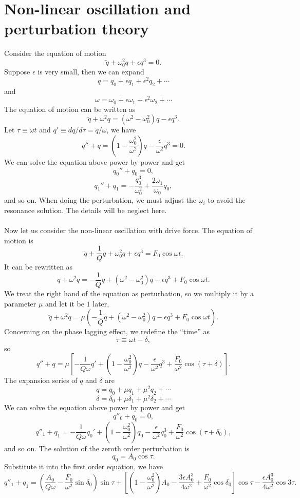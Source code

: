 \section{Non-linear oscillation and perturbation theory}
Consider the equation of motion
\[\ddot{q} + \omega_0^2 q + \epsilon q^3 = 0.\]
Suppose $\epsilon$ is very small, then we can expand
\[q = q_0 + \epsilon q_1 + \epsilon^2 q_2 + \cdots \]
and
\[\omega = \omega_0 + \epsilon \omega_1 + \epsilon^2 \omega_2 + \cdots \]
The equation of motion can be written as
\[\ddot{q} + \omega^2 q = (\omega^2 -\omega_0^2)q - \epsilon q^3.\]
Let $\tau \equiv \omega t$ and $q' \equiv {dq}/{d\tau} = {\dot{q}}/{\omega}$, we have
\[q'' + q = (1- \frac{\omega_0^2}{\omega^2})q - \frac{\epsilon}{\omega^2} q^3 = 0.\]
We can solve the equation above power by power and get
\[q_0'' + q_0 = 0 ,\]
\[q_1'' + q_1 = -\frac{q_0^3}{\omega_0^2} + \frac{2\omega_1}{\omega_0}q_0, \]
and so on. 
When doing the perturbation, we must adjust the $\omega_i$ to avoid the resonance solution. The details will be neglect here.
\\ \\
Now let us consider the non-linear oscillation with drive force. The equation of motion is
\[\ddot{q} + \frac{1}{Q}\dot{q} + \omega_0^2 q + \epsilon q^3 = F_0 \cos \omega t.\]
It can be rewritten as
\[\ddot{q} + \omega^2 q = - \frac{1}{Q} \dot{q} + (\omega^2 - \omega_0^2)q - \epsilon q^3 + F_0\cos\omega t.\]
We treat the right hand of the equation as perturbation, so we multiply it by a parameter $\mu$ and let it be $1$ later,
\[\ddot{q} + \omega^2 q = \mu \left (- \frac{1}{Q} \dot{q} + (\omega^2 - \omega_0^2)q - \epsilon q^3 + F_0\cos\omega t \right ).\]
Concerning on the phase lagging effect, we redefine the ``time'' as 
\[\tau \equiv \omega t - \delta, \]
so 
\[q'' + q = \mu \left [ -\frac{1}{Q\omega} q' + \left ( 1- \frac{\omega_0^2}{\omega^2} \right ) q - \frac{\epsilon}{\omega^2} q^3 + \frac{F_0}{\omega^2} \cos (\tau + \delta) \right ].\]
The expansion series of $q$ and $\delta$ are
\[q = q_0 + \mu q_1 + \mu^2 q_2 + \cdots \]
\[\delta = \delta_0 + \mu \delta_1 + \mu^2 \delta_2 + \cdots \]
We can solve the equation above power by power and get
\[q''_0 + q_0 = 0,\]
\[q''_1 + q_1 =  -\frac{1}{Q\omega} q_0' + \left ( 1- \frac{\omega_0^2}{\omega^2} \right ) q_0 - \frac{\epsilon}{\omega^2} q_0^3 + \frac{F_0}{\omega^2} \cos (\tau + \delta_0), \]
and so on. 
The solution of the zeroth order perturbation is
\[q_0 = A_0 \cos\tau.\]
Substitute it into the first order equation, we have
\[q''_1 + q_1 = \left ( \frac{A_0}{Q\omega} - \frac{F_0}{\omega^2} \sin\delta_0 \right ) \sin\tau + \left [ \left ( 1 - \frac{\omega_0^2}{\omega^2}\right ) A_0 - \frac{3\epsilon A_0^3}{4\omega^2} + \frac{F_0}{\omega^2}\cos\delta_0 \right ] \cos\tau - \frac{\epsilon A_0^3}{4\omega^2} \cos 3\tau.\]
